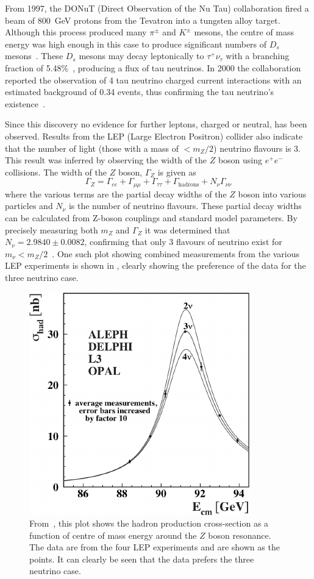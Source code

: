 From 1997, the DONuT (Direct Observation of the Nu Tau) collaboration fired a beam of 800~GeV protons from the Tevatron into a tungsten alloy target.
Although this process produced many $\pi^{\pm}$ and $K^{\pm}$ mesons, the centre of mass energy was high enough in this case to produce significant numbers of $D_{s}$ mesons~\cite{donutFinal}.
These $D_{s}$ mesons may decay leptonically to $\tau^{+}\nu_{\tau}$ with a branching fraction of 5.48\%~\cite{pdg2020}, producing a flux of tau neutrinos.
In 2000 the collaboration reported the observation of 4 tau neutrino charged current interactions with an estimated background of 0.34 events, thus confirming the tau neutrino's existence~\cite{tauNeutrino}.  

Since this discovery no evidence for further leptons, charged or neutral, has been observed.
Results from the LEP (Large Electron Positron) collider also indicate that the number of light (those with a mass of $<m_{Z}/2$) neutrino flavours is 3.
This result was inferred by observing the width of the $Z$ boson using $e^{+}e^{-}$ collisions.
The width of the $Z$ boson, $\Gamma_{Z}$ is given as
\begin{equation}
  \Gamma_{Z} = \Gamma_{ee} + \Gamma_{\mu\mu} + \Gamma_{\tau\tau} + \Gamma_{\text{hadrons}} + N_{\nu}\Gamma_{\nu\nu}
\end{equation}
where the various terms are the partial decay widths of the $Z$ boson into various particles and $N_{\nu}$ is the number of neutrino flavours.
These partial decay widths can be calculated from Z-boson couplings and standard model parameters.
By precisely measuring both $m_{Z}$ and $\Gamma_{Z}$ it was determined that $N_{\nu} = 2.9840 \pm 0.0082$, confirming that only 3 flavours of neutrino exist for $m_{\nu} < m_{Z}/2$~\cite{zBosonWidth}.
One such plot showing combined measurements from the various LEP experiments is shown in , clearly showing the preference of the data for the three neutrino case.

\begin{figure}[h]
  \centering
  \includegraphics[width=.5\linewidth]{files/figures/theory/zBosonWidth}
  \caption[Hadron production cross-section around $Z$ boson resonance.]{From~\cite{zBosonWidth}, this plot shows the hadron production cross-section as a function of centre of mass energy around the $Z$ boson resonance. The data are from the four LEP experiments and are shown as the points. It can clearly be seen that the data prefers the three neutrino case.}
  \label{fig:zBosonWidth}
\end{figure}


